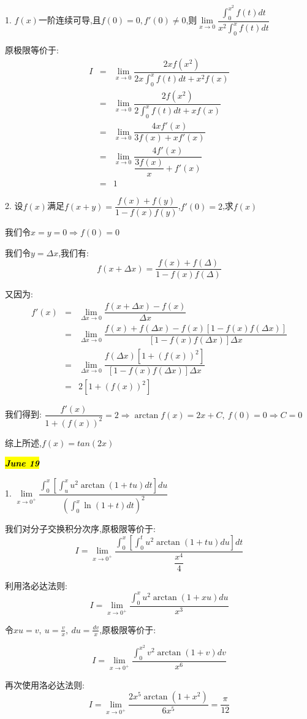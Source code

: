 1. $f(x)$一阶连续可导,且$f(0)=0,f'(0)\neq 0$,则$\lim\limits_{x\rightarrow 0}\dfrac{\int_{0}^{x^2}f(t)dt}{x^2\int_{0}^{x}f(t)dt}$
\begin{solution}
	
	原极限等价于: 
	\begin{eqnarray*}
		I&=&\lim\limits_{x\rightarrow 0}\dfrac{2xf(x^2)}{2x\int_{0}^{x}f(t)dt+x^2f(x)}\\
		&=&\lim\limits_{x\rightarrow 0}\dfrac{2f(x^2)}{2\int_{0}^{x}f(t)dt+xf(x)}\\
		&=&\lim\limits_{x\rightarrow 0}\dfrac{4xf'(x)}{3f(x)+xf'(x)}\\
		&=&\lim\limits_{x\rightarrow 0}\dfrac{4f'(x)}{\dfrac{3f(x)}{x}+f'(x)}\\
		&=&1
	\end{eqnarray*}
\end{solution}

2. 设$f(x)$满足$f(x+y)=\dfrac{f(x)+f(y)}{1-f(x)f(y)}$,$f'(0)=2$,求$f(x)$
\begin{solution}
	
	我们令$x=y=0\Rightarrow f(0)=0$
	
	我们令$y=\Delta x$,我们有: 
	$$f(x+\Delta x)=\dfrac{f(x)+f(\Delta)}{1-f(x)f(\Delta)}$$
	
	又因为: 
	\begin{eqnarray*}
		f'(x)&=&\lim\limits_{\Delta x\rightarrow 0}\dfrac{f(x+\Delta x)-f(x)}{\Delta x}\\
		&=&\lim\limits_{\Delta x\rightarrow 0}\dfrac{f(x )+f(\Delta x)-f(x)[1-f(x)f(\Delta x)]}{[1-f(x)f(\Delta x)]\Delta x}\\
		&=&\lim\limits_{\Delta x\rightarrow 0}\dfrac{f(\Delta x)[1+(f(x))^2]}{[1-f(x)f(\Delta x)]\Delta x}\\
		&=&2[1+(f(x))^2]
	\end{eqnarray*}
	
	我们得到: $\dfrac{f'(x)}{1+(f(x))^2}=2\Rightarrow \arctan f(x)=2x+C,\ f(0)=0\Rightarrow C=0$
	
	综上所述,$f(x)=tan (2x)$
\end{solution}

\hl{\textbf{\textit{June 19}}}

1. $\lim\limits_{x\rightarrow 0^{+}}\dfrac{\int_{0}^{x}[\int_{u}^{x}u^2\arctan (1+tu)dt]du}{(\int_{0}^{x}\ln(1+t)dt)^2}$
\begin{solution}
	
	我们对分子交换积分次序,原极限等价于: 
	$$I=\lim\limits_{x\rightarrow 0^{+}}\dfrac{\int_{0}^{x}[\int_{0}^{t}u^2\arctan (1+tu)du]dt}{\dfrac{x^4}{4}}$$
	
	利用洛必达法则: 
	$$I=\lim\limits_{x\rightarrow 0^{+}}\dfrac{\int_{0}^{x}u^2\arctan (1+xu)du}{x^3}$$
	
	令$xu=v,\ u=\frac{v}{x},\ du=\frac{dv}{x}$,原极限等价于: 
	
	$$I=\lim\limits_{x\rightarrow 0^{+}}\dfrac{\int_{0}^{x^2}v^2\arctan (1+v)dv}{x^6}$$
	
	再次使用洛必达法则: 
	$$I=\lim\limits_{x\rightarrow 0^{+}}\dfrac{2x^5\arctan (1+x^2)}{6x^5}=\dfrac{\pi}{12}$$
\end{solution}

